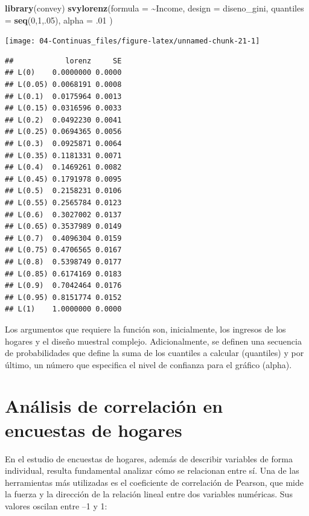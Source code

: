 \documentclass[
  12pt,
]{book}
\newenvironment{Shaded}{\begin{snugshade}}{\end{snugshade}}
\newcommand{\AttributeTok}[1]{\textcolor[rgb]{0.13,0.29,0.53}{#1}}
\newcommand{\DecValTok}[1]{\textcolor[rgb]{0.00,0.00,0.81}{#1}}
\newcommand{\FunctionTok}[1]{\textcolor[rgb]{0.13,0.29,0.53}{\textbf{#1}}}
\newcommand{\NormalTok}[1]{#1}
\newcommand{\SpecialCharTok}[1]{\textcolor[rgb]{0.81,0.36,0.00}{\textbf{#1}}}
\begin{document}
\begin{Shaded}
\begin{Highlighting}[]
\FunctionTok{library}\NormalTok{(convey)}
\FunctionTok{svylorenz}\NormalTok{(}\AttributeTok{formula =} \SpecialCharTok{\textasciitilde{}}\NormalTok{Income,}
          \AttributeTok{design =}\NormalTok{ diseno\_gini,}
          \AttributeTok{quantiles =} \FunctionTok{seq}\NormalTok{(}\DecValTok{0}\NormalTok{,}\DecValTok{1}\NormalTok{,.}\DecValTok{05}\NormalTok{),}
          \AttributeTok{alpha =}\NormalTok{ .}\DecValTok{01}\NormalTok{ )}
\end{Highlighting}
\end{Shaded}

\begin{center}\texttt{[image: 04-Continuas\_files/figure-latex/unnamed-chunk-21-1]} \end{center}

\begin{verbatim}
##            lorenz     SE
## L(0)    0.0000000 0.0000
## L(0.05) 0.0068191 0.0008
## L(0.1)  0.0175964 0.0013
## L(0.15) 0.0316596 0.0033
## L(0.2)  0.0492230 0.0041
## L(0.25) 0.0694365 0.0056
## L(0.3)  0.0925871 0.0064
## L(0.35) 0.1181331 0.0071
## L(0.4)  0.1469261 0.0082
## L(0.45) 0.1791978 0.0095
## L(0.5)  0.2158231 0.0106
## L(0.55) 0.2565784 0.0123
## L(0.6)  0.3027002 0.0137
## L(0.65) 0.3537989 0.0149
## L(0.7)  0.4096304 0.0159
## L(0.75) 0.4706565 0.0167
## L(0.8)  0.5398749 0.0177
## L(0.85) 0.6174169 0.0183
## L(0.9)  0.7042464 0.0176
## L(0.95) 0.8151774 0.0152
## L(1)    1.0000000 0.0000
\end{verbatim}

Los argumentos que requiere la función son, inicialmente, los ingresos de los hogares y el diseño muestral complejo. Adicionalmente, se definen una secuencia de probabilidades que define la suma de los cuantiles a calcular (quantiles) y por último, un número que especifica el nivel de confianza para el gráfico (alpha).

\section{Análisis de correlación en encuestas de hogares}\label{anuxe1lisis-de-correlaciuxf3n-en-encuestas-de-hogares}

En el estudio de encuestas de hogares, además de describir variables de forma individual, resulta fundamental analizar cómo se relacionan entre sí. Una de las herramientas más utilizadas es el coeficiente de correlación de Pearson, que mide la fuerza y la dirección de la relación lineal entre dos variables numéricas. Sus valores oscilan entre --1 y 1:
\end{document}
